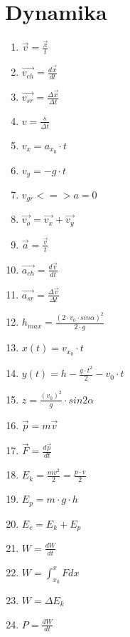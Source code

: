 \documentclass[12pt,twoside,a4paper]{book}
\begin{document}
\section{Dynamika}
\begin{enumerate}
\item$\overrightarrow{v} = \frac{\overrightarrow{x}}{t}$
\item$\overrightarrow{v_{ch}} = \frac{d\overrightarrow{x}}{dt}$
\item$\overrightarrow{v_{sr}} = \frac{\Delta \overrightarrow{x}}{\Delta t}$
\item$v=\frac{s}{\Delta t}$
\item$v_{x}= a_{x_0} \cdot t$
\item$v_{y}= -g \cdot t$
\item$v_{gr} <=> a = 0$
\item$\overrightarrow{v_o} = \overrightarrow{v_x} + \overrightarrow{v_y}$
\item$\overrightarrow{a} = \frac{\overrightarrow{v}}{t}$
\item$\overrightarrow{a_{ch}} = \frac{d\overrightarrow{v}}{dt}$
\item$\overrightarrow{a_{sr}} = \frac{\Delta \overrightarrow{v}}{\Delta t}$
\item$h_{max} = \frac{(2 \cdot v_0 \cdot sin\alpha)^2}{2 \cdot g}$
\item$x(t)= v_{x_0} \cdot t$
\item$y(t)= h - \frac{g \cdot t^2 }{2} - v_0 \cdot t$
\item$z = \frac{(v_0)^2}{g} \cdot sin2\alpha$
\item$\overrightarrow{p} = m\overrightarrow{v}$
\item$\overrightarrow{F} = \frac{d\overrightarrow{p}}{dt}$
\item$E_k = \frac{mv^2}{2} = \frac{p \cdot v}{2}$
\item$E_p = m \cdot g \cdot h$
\item$E_c = E_k + E_p$
\item$W = \frac{dW}{dt}$
\item$W = \int_{x_0}^{x} Fdx$
\item$W = \Delta E_k$
\item$P = \frac{dW}{dt}$
\end{enumerate}
\end{document}
